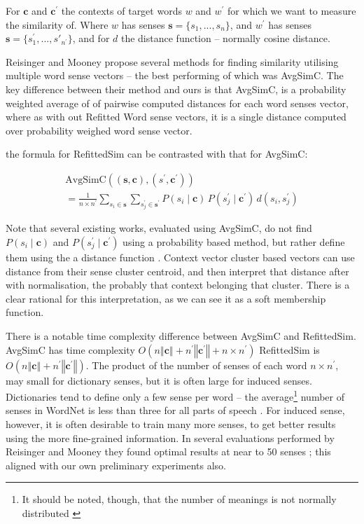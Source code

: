 \documentclass{sig-alternate}
\renewcommand{\c}{\mathbf{c}}
\newcommand{\s}{\mathbf{s}}
\begin{document}
For $\c$ and $\c^\prime$ the contexts of target words $w$ and $w^\prime$ for which we want to measure the similarity of. Where $w$ has senses $\s=\{s_1,...,s_n\}$, and $w^\prime$ has senses $\s=\{s^\prime_1,...,s\prime_{n^\prime}\}$, and for $d$ the distance function -- normally cosine distance. 

Reisinger and Mooney \parencite{Reisinger2010} propose several methods for finding similarity utilising multiple word sense vectors -- the best performing of which was AvgSimC.
The key difference between their method and ours is that AvgSimC, is a probability weighted average of of pairwise computed distances for each word senses vector,
where as with out Refitted Word sense vectors, it is a single distance computed over probability weighed word sense vector.

the formula for RefittedSim  can be contrasted with that for AvgSimC:


\begin{multline}
	\mathrm{AvgSimC}((\s,\c),(s^{\prime},\c^{\prime})) \\
	=  \frac{1}{n \times n^{\prime}} 
	\sum_{s_{i}\in\s}
	\sum_{s_{j}^{\prime}\in\s^{\prime}}
	P(s_{i}\mid\c)\,P(s_{j}^{\prime}\mid\c^{\prime})\,d(s_{i},s_{j}^{\prime})
\end{multline}


Note that several existing works, evaluated using AvgSimC, do not find $P(s_{i}\mid\c)$ and $P(s_{j}^{\prime}\mid\c^\prime)$ using a probability based method, but rather define them using the a distance function \parencite{Reisinger2010, Huang2012}. Context vector cluster based vectors can use distance from their sense cluster centroid, and then interpret that distance after with normalisation, the probably that context belonging that cluster. There is a clear rational for this interpretation, as we can see it as a soft membership function. 
 

There is a notable time complexity difference between AvgSimC and RefittedSim.
AvgSimC has time complexity $O(n\left\Vert \c\right\Vert +n^{\prime}\left\Vert \c^{\prime}\right\Vert +n\times n^{\prime})$
RefittedSim is $O(n\left\Vert \c\right\Vert +n^{\prime}\left\Vert \c^{\prime}\right\Vert)$.
The product of the number of senses of each word $n \times n^\prime$, may small for dictionary senses, but it is often large for induced senses. Dictionaries tend to define only a few sense per word -- the average\footnote{It should be noted, though, that the number of meanings is not normally distributed \parencite{zipf1945meaning}} number of senses in WordNet is less than three for all parts of speech \parencite{miller1995wordnet}. For induced sense, however, it is often desirable to train many more senses, to get better results using the more fine-grained information. In several evaluations performed by Reisinger and Mooney they found optimal results at near to 50 senses \parencite{Reisinger2010}; this aligned with our own preliminary experiments also.
\end{document}

